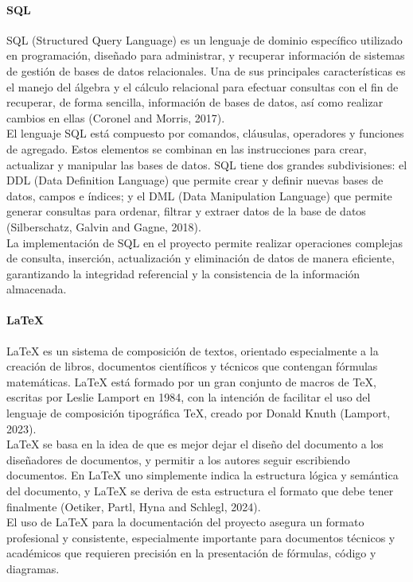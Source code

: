 \documentclass[12pt, letterpaper]{article}
\begin{document}
\paragraph{\textbf{SQL}}
SQL (Structured Query Language) es un lenguaje de dominio específico utilizado en programación, diseñado para administrar, y recuperar información de sistemas de gestión de bases de datos relacionales. Una de sus principales características es el manejo del álgebra y el cálculo relacional para efectuar consultas con el fin de recuperar, de forma sencilla, información de bases de datos, así como realizar cambios en ellas (Coronel and Morris, 2017).\\
El lenguaje SQL está compuesto por comandos, cláusulas, operadores y funciones de agregado. Estos elementos se combinan en las instrucciones para crear, actualizar y manipular las bases de datos. SQL tiene dos grandes subdivisiones: el DDL (Data Definition Language) que permite crear y definir nuevas bases de datos, campos e índices; y el DML (Data Manipulation Language) que permite generar consultas para ordenar, filtrar y extraer datos de la base de datos (Silberschatz, Galvin and Gagne, 2018).\\
La implementación de SQL en el proyecto permite realizar operaciones complejas de consulta, inserción, actualización y eliminación de datos de manera eficiente, garantizando la integridad referencial y la consistencia de la información almacenada.\\
\paragraph{\textbf{LaTeX}}
LaTeX es un sistema de composición de textos, orientado especialmente a la creación de libros, documentos científicos y técnicos que contengan fórmulas matemáticas. LaTeX está formado por un gran conjunto de macros de TeX, escritas por Leslie Lamport en 1984, con la intención de facilitar el uso del lenguaje de composición tipográfica TeX, creado por Donald Knuth (Lamport, 2023).\\
LaTeX se basa en la idea de que es mejor dejar el diseño del documento a los diseñadores de documentos, y permitir a los autores seguir escribiendo documentos. En LaTeX uno simplemente indica la estructura lógica y semántica del documento, y LaTeX se deriva de esta estructura el formato que debe tener finalmente (Oetiker, Partl, Hyna and Schlegl, 2024).\\
El uso de LaTeX para la documentación del proyecto asegura un formato profesional y consistente, especialmente importante para documentos técnicos y académicos que requieren precisión en la presentación de fórmulas, código y diagramas.\\
\newpage
\end{document}
